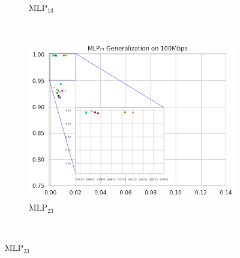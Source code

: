 \documentclass[a4paper,fleqn]{cas-sc}
\begin{document}
\begin{figure}[h!]
\begin{minipage}[t]{0.46\textwidth}
\begin{subfigure}[t]{0.33\textwidth}
				\caption{MLP$_{13}$}
				\label{fig:Generalizacao-MLP13-100Mbps}
			\end{subfigure}%
			~
			\begin{subfigure}[t]{0.33\textwidth}
				\includegraphics[draft=false, width=\textwidth]{./figs/Generalizacao-MLP23-100Mbps.png} 
				\caption{MLP$_{23}$}
				\label{fig:Generalizacao-MLP23-100Mbps}
			\end{subfigure}%
			~
			

\end{minipage}
\end{figure}
\end{document}
